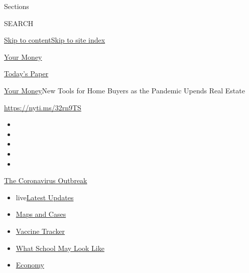 Sections

SEARCH

\protect\hyperlink{site-content}{Skip to
content}\protect\hyperlink{site-index}{Skip to site index}

\href{https://www.nytimes3xbfgragh.onion/section/your-money}{Your Money}

\href{https://myaccount.nytimes3xbfgragh.onion/auth/login?response_type=cookie\&client_id=vi}{}

\href{https://www.nytimes3xbfgragh.onion/section/todayspaper}{Today's
Paper}

\href{/section/your-money}{Your Money}\textbar{}New Tools for Home
Buyers as the Pandemic Upends Real Estate

\url{https://nyti.ms/32rn9TS}

\begin{itemize}
\item
\item
\item
\item
\item
\end{itemize}

\href{https://www.nytimes3xbfgragh.onion/news-event/coronavirus?action=click\&pgtype=Article\&state=default\&region=TOP_BANNER\&context=storylines_menu}{The
Coronavirus Outbreak}

\begin{itemize}
\tightlist
\item
  live\href{https://www.nytimes3xbfgragh.onion/2020/08/01/world/coronavirus-covid-19.html?action=click\&pgtype=Article\&state=default\&region=TOP_BANNER\&context=storylines_menu}{Latest
  Updates}
\item
  \href{https://www.nytimes3xbfgragh.onion/interactive/2020/us/coronavirus-us-cases.html?action=click\&pgtype=Article\&state=default\&region=TOP_BANNER\&context=storylines_menu}{Maps
  and Cases}
\item
  \href{https://www.nytimes3xbfgragh.onion/interactive/2020/science/coronavirus-vaccine-tracker.html?action=click\&pgtype=Article\&state=default\&region=TOP_BANNER\&context=storylines_menu}{Vaccine
  Tracker}
\item
  \href{https://www.nytimes3xbfgragh.onion/interactive/2020/07/29/us/schools-reopening-coronavirus.html?action=click\&pgtype=Article\&state=default\&region=TOP_BANNER\&context=storylines_menu}{What
  School May Look Like}
\item
  \href{https://www.nytimes3xbfgragh.onion/live/2020/07/31/business/stock-market-today-coronavirus?action=click\&pgtype=Article\&state=default\&region=TOP_BANNER\&context=storylines_menu}{Economy}
\end{itemize}

